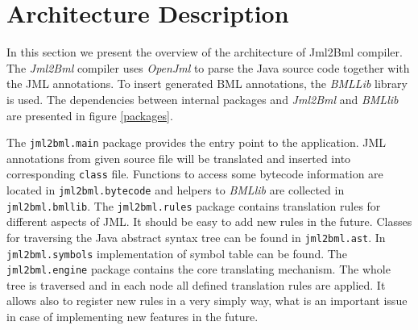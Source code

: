 \documentclass{acm_proc_article-sp}
\begin{document}
\section{Architecture Description}
In this section we present the overview of the architecture of Jml2Bml compiler. The \textit{Jml2Bml} compiler uses \textit{OpenJml} to parse the Java source code together with the JML annotations. To insert generated BML annotations, the \textit{BMLLib} library is used. The dependencies between internal packages and \textit{Jml2Bml} and \textit{BMLlib} are presented in figure \ref{packages}.

The \texttt{jml2bml.main} package provides the entry point to the application. JML annotations from given source file will be translated and inserted into corresponding \texttt{class} file. Functions to access some bytecode information are located in \texttt{jml2bml.bytecode} and helpers to \textit{BMLlib} are collected in \texttt{jml2bml.bmllib}. The \texttt{jml2bml.rules} package contains translation rules for different aspects of JML. It should be easy to add new rules in the future. Classes for traversing the Java abstract syntax tree can be found in \texttt{jml2bml.ast}. In \texttt{jml2bml.symbols} implementation of symbol table can be found. The \texttt{jml2bml.engine} package contains the core translating mechanism. The whole tree is traversed and in each node all defined translation rules are applied. It allows also to register new rules in a very simply way, what is an important issue in case of implementing new features in the future.
\end{document}
